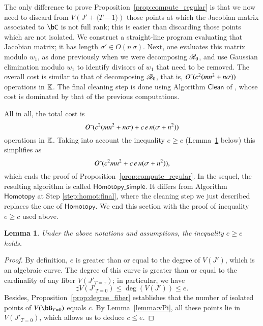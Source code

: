 \documentclass[amsthm]{elsart}
\newtheorem{lemma}[definition]{Lemma}
\begin{document}
The only difference to prove Proposition~\ref{prop:compute_regular} is
that we now need to discard from $V(J' + \langle T-1\rangle)$ those
points at which the Jacobian matrix associated to $\bC$ is not full
rank; this is easier than discarding those points which are not
isolated. We construct a straight-line program evaluating that
Jacobian matrix; it has length
$\sigma'\in O(n \, \sigma)$. Next, one evaluates this matrix modulo
$w_1$, as done previously when we were decomposing $\mathscr{R}_0$, and use
Gaussian elimination modulo $w_1$ to identify divisors of $w_1$ that
need to be removed. The overall cost is similar to that of decomposing
$\mathscr{R}_0$, that is, ${O}{\,\tilde{ }\,}(c^2(mn^2+n\sigma))$ operations in $\mathbb{K}$.
The final cleaning step is done using Algorithm $\mathsf{Clean}$ of
\cite{GiLeSa01}, whose cost is dominated by that of the previous computations.

All in all, the total cost is
$$
{O}{\,\tilde{ }\,}(c^2(mn^2+n\sigma) + c\, e\,n (\sigma+n^2)  )
$$
operations in $\mathbb{K}$. Taking into account the inequality
$e\geq c$ (Lemma~\ref{lemma:e-geq-c} below) this simplifies as 
$$
{O}{\,\tilde{ }\,}(c^2 mn^2  + c\, e\,n (\sigma+n^2) ),
$$
which ends the proof of Proposition~\ref{prop:compute_regular}. In the
sequel, the resulting algorithm is called
$\mathsf{Homotopy\_simple}$. It differs from Algorithm
$\mathsf{Homotopy}$ at Step \ref{step:homot:final}, where the cleaning step we
just described replaces the one of $\mathsf{Homotopy}$.
We end this section with the proof of inequality $e\geq c$ used above.
\begin{lemma}\label{lemma:e-geq-c}
Under the above notations and assumptions, the inequality $e\geq c$ holds.   
\end{lemma}
\begin{proof}
  By definition, $e$ is greater than or equal to the degree of
  $V(J')$, which is an algebraic curve.  The degree of this curve is
  greater than or equal to the cardinality of any fiber
  $V(J'_{T=\tau})$; in particular, we have
  \[
  \sharp V(J'_{T=0}) \leq \deg(V(J')) \leq e.
  \]
  Besides, Proposition~\ref{prop:degree_fiber} establishes that the
  number of isolated points of $V(\bB_{T=0})$ equals $c$. By Lemma~\ref{lemma:vPi}, all
  these points lie in $V(J'_{T=0})$, which allows us to deduce $c\leq e$.
\end{proof}

\end{document}
